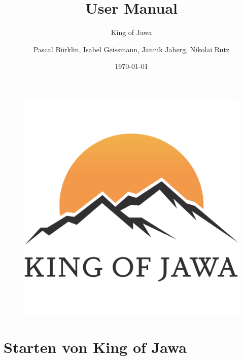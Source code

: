 \documentclass{scrartcl}
\title{User Manual}
\subtitle{King of Jawa}
\author{Pascal Bürklin, Isabel Geissmann, Jannik Jaberg, Nikolai Rutz}
\date{\today}
\begin{document}
\maketitle
\begin{figure}[H]
	\includegraphics[width=\linewidth]{LOGO.png}
\end{figure}
\tableofcontents
\pagebreak
\section{Starten von King of Jawa}
\end{document}
